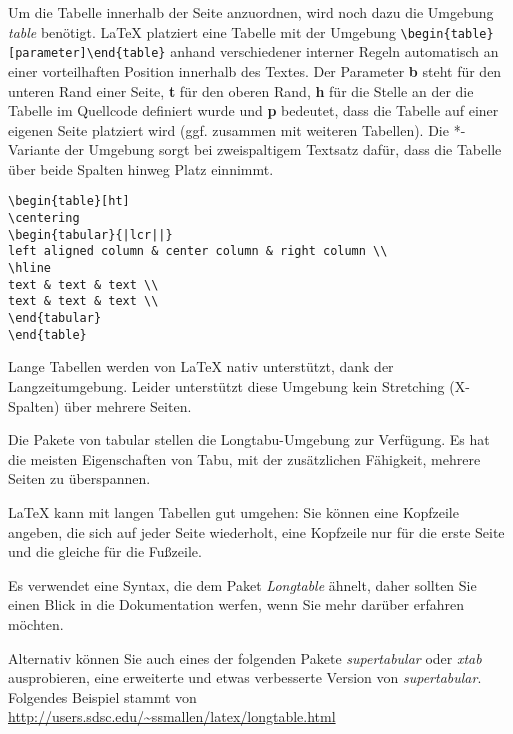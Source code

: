 \bigskip

Um die Tabelle innerhalb der Seite anzuordnen, wird noch dazu die Umgebung \emph{table} benötigt. \LaTeX{} platziert eine Tabelle mit der Umgebung \verb|\begin{table}[parameter]\end{table}| anhand verschiedener interner Regeln automatisch an einer vorteilhaften Position innerhalb des Textes. Der Parameter \textbf{b} steht für den unteren Rand einer Seite, \textbf{t} für den oberen Rand, \textbf{h} für die Stelle an der die Tabelle im Quellcode definiert wurde und \textbf{p} bedeutet, dass die Tabelle auf einer eigenen Seite platziert wird (ggf. zusammen mit weiteren Tabellen). Die *-Variante der Umgebung sorgt bei zweispaltigem Textsatz dafür, dass die Tabelle über beide Spalten hinweg Platz einnimmt.

\begin{lstlisting}[style=Latex,caption={Einfache Tabelle mit Umgebung table},label=lst:tab3]
\begin{table}[ht]
\centering
\begin{tabular}{|lcr||}
left aligned column & center column & right column \\
\hline
text & text & text \\
text & text & text \\
\end{tabular}
\end{table}
\end{lstlisting}

Lange Tabellen werden von \LaTeX{} nativ unterstützt, dank der Langzeitumgebung. Leider unterstützt diese Umgebung kein Stretching (X-Spalten) über mehrere Seiten.

Die Pakete von tabular stellen die Longtabu-Umgebung zur Verfügung. Es hat die meisten Eigenschaften von Tabu, mit der zusätzlichen Fähigkeit, mehrere Seiten zu überspannen.

\LaTeX{} kann mit langen Tabellen gut umgehen: Sie können eine Kopfzeile angeben, die sich auf jeder Seite wiederholt, eine Kopfzeile nur für die erste Seite und die gleiche für die Fußzeile.

Es verwendet eine Syntax, die dem Paket \emph{Longtable} ähnelt, daher sollten Sie einen Blick in die Dokumentation werfen, wenn Sie mehr darüber erfahren möchten.

Alternativ können Sie auch eines der folgenden Pakete \emph{supertabular} oder \emph{xtab} ausprobieren, eine erweiterte und etwas verbesserte Version von \emph{supertabular}.
Folgendes Beispiel stammt von \url{http://users.sdsc.edu/~ssmallen/latex/longtable.html}


